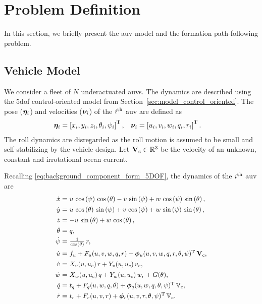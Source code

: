\section{Problem Definition}
\label{sec:nsb_5dof_model}
In this section, we briefly present the \gls{auv} model and the formation path-following problem.

\subsection{Vehicle Model}
We consider a fleet of $N$ underactuated \glspl{auv}.
The dynamics are described using the 5\gls{dof} control-oriented model from Section~\ref{sec:model_control_oriented}.
The pose ($\bm{\eta}_i$) and velocities ($\bm{\nu}_i$) of the $i^{\rm th}$ \gls{auv} are defined as
\begin{align}
    \bm{\eta}_i &= \left[x_i, y_i, z_i, \theta_i, \psi_i\right]^{\mathrm{T}}, &
    \bm{\nu}_i &= \left[u_i, v_i, w_i, q_i, r_i\right]^{\mathrm{T}}.
\end{align}
The roll dynamics are disregarded as the roll motion is assumed to be small and self-stabilizing by the vehicle design.
Let $\mathbf{V}_c \in \mathbb{R}^3$ be the velocity of an unknown, constant and irrotational ocean current.

Recalling \eqref{eq:background_component_form_5DOF}, the dynamics of the $i^{\rm th}$ \gls{auv} are
\begin{subequations}
    \begin{align}
        \scale[0.93]{\dot{x}} &= \scale[0.93]{u\,\cos\left(\psi \right)\,\cos\left(\theta \right)-v\,\sin\left(\psi \right)+w\,\cos\left(\psi \right)\,\sin\left(\theta \right),} \\
        \scale[0.93]{\dot{y}} &= \scale[0.93]{u\,\cos\left(\theta \right)\,\sin\left(\psi \right)+v\,\cos\left(\psi \right)+w\,\sin\left(\psi \right)\,\sin\left(\theta \right),} \\
        \scale[0.93]{\dot{z}} &= \scale[0.93]{-u\,\sin\left(\theta \right)+w\,\cos\left(\theta \right),} \\
        \scale[0.93]{\dot{\theta}} &= \scale[0.93]{q,} \label{eq:nsb_5dof_theta_dot} \\
        \scale[0.93]{\dot{\psi}} &= \scale[0.93]{\frac{1}{\cos\left(\theta \right)}\,r,} \label{eq:nsb_5dof_psi_dot} \\
        \scale[0.93]{\dot{u}} &= \scale[0.93]{f_u + F_u(u, v, w, q, r) + \bs{\phi}_u(u, v, w, q, r, \theta, \psi)\T\,\ocean,} \label{eq:nsb_5dof_u_dot} \\
        \scale[0.93]{\dot{v}} &= \scale[0.93]{X_v(u, u_c)\,r + Y_v(u, u_c)\,v_r,} \\
        \scale[0.93]{\dot{w}} &= \scale[0.93]{X_w(u, u_c)\,q + Y_w(u, u_c)\,w_r + G(\theta),} \\
        \scale[0.93]{\dot{q}} &= \scale[0.93]{t_q + F_q(u, w, q, \theta) + \bs{\phi}_q(u, w, q, \theta, \psi)\T\,\mathbb{V}_c,} \label{eq:nsb_5dof_q_dot} \\
        \scale[0.93]{\dot{r}} &= \scale[0.93]{t_r + F_r(u, v, r) + \bs{\phi}_r(u, v, r, \theta, \psi)\T\,\mathbb{V}_c.} \label{eq:nsb_5dof_r_dot} 
    \end{align} \label{eq:nsb_5dof_components}
\end{subequations}

